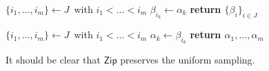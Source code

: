 \documentclass[10pt, psamsfonts, reqno]{amsart}
\theoremstyle{definition}
\theoremstyle{remark}
\numberwithin{equation}{section}
\begin{document}
\begin{minipage}[t]{0.46\textwidth}
\vspace{0pt}
\begin{algorithm}[H]
    \centering
    \caption{$\mathsf{Zip}\hspace{1pt}
    (\alpha_1, \dots, \alpha_m;
    \hspace{2pt} J\hspace{1pt})$}\label{alg_zip}
    \begin{algorithmic}
    	\vspace{2pt}
    	\State
			$\{i_1, \dots, i_m\} \leftarrow J$\ with
			$i_1 < \dots < i_m$\vspace{3pt}
    	\vspace{2pt}
			\State
    			$\beta_{i_k} \leftarrow \alpha_k$\vspace{2pt}
		\EndFor
        \State \textbf{return $\{\beta_i\}_{i \in J}$}
    \end{algorithmic}
\end{algorithm}
\vspace{0pt}
\end{minipage}
\hfill
\begin{minipage}[t]{0.46\textwidth}
\vspace{0pt}
\begin{algorithm}[H]
    \centering
    \caption{$\mathsf{Zip}^{-1}\hspace{1pt}
    (\hspace{1pt}\{\beta_i\}_{i \in J})$}\label{alg_zip_inv}
    \begin{algorithmic}
    	\vspace{2pt}
    	\State
			$\{i_1, \dots, i_m\} \leftarrow J$\ with
			$i_1 < \dots < i_m$\vspace{3pt}
    	\vspace{2pt}
			\State
    			$\alpha_k \leftarrow \beta_{i_k}$\vspace{2pt}
		\EndFor
        \State \textbf{return $\alpha_1, \dots, \alpha_m$}
    \end{algorithmic}
\end{algorithm}\vspace{0pt}
\vspace{0pt}
\end{minipage}

\noindent
It should be clear that $\mathsf{Zip}$
preserves the uniform sampling.
\end{document}
